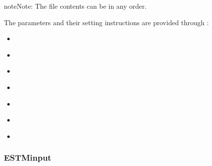 \documentclass[letterpaper,10pt,english]{sphinxmanual}
\begin{document}
\begin{sphinxadmonition}{note}{Note:}
The file contents can be in any order.
\end{sphinxadmonition}

The parameters and their setting instructions
are provided through {\hyperref[\detokenize{input_files/ESTM_related_files/ESTMinput:estminput}]{}}:
\begin{itemize}\setlength{\itemsep}{0pt}\setlength{\parskip}{0pt}
\item {} 
{\hyperref[\detokenize{input_files/ESTM_related_files/ESTMinput:cmdoption-arg-tsurfchoice}]{}}

\item {} 
{\hyperref[\detokenize{input_files/ESTM_related_files/ESTMinput:cmdoption-arg-evolvetibld}]{}}

\item {} 
{\hyperref[\detokenize{input_files/ESTM_related_files/ESTMinput:cmdoption-arg-ibldchmod}]{}}

\item {} 
{\hyperref[\detokenize{input_files/ESTM_related_files/ESTMinput:cmdoption-arg-lbc-soil}]{}}

\item {} 
{\hyperref[\detokenize{input_files/ESTM_related_files/ESTMinput:cmdoption-arg-theat-fix}]{}}

\item {} 
{\hyperref[\detokenize{input_files/ESTM_related_files/ESTMinput:cmdoption-arg-theat-off}]{}}

\item {} 
{\hyperref[\detokenize{input_files/ESTM_related_files/ESTMinput:cmdoption-arg-theat-on}]{}}

\end{itemize}


\subsubsection{ESTMinput}
\label{\detokenize{input_files/ESTM_related_files/ESTMinput::doc}}\label{\detokenize{input_files/ESTM_related_files/ESTMinput:estminput}}\label{\detokenize{input_files/ESTM_related_files/ESTMinput:id1}}
\end{document}
